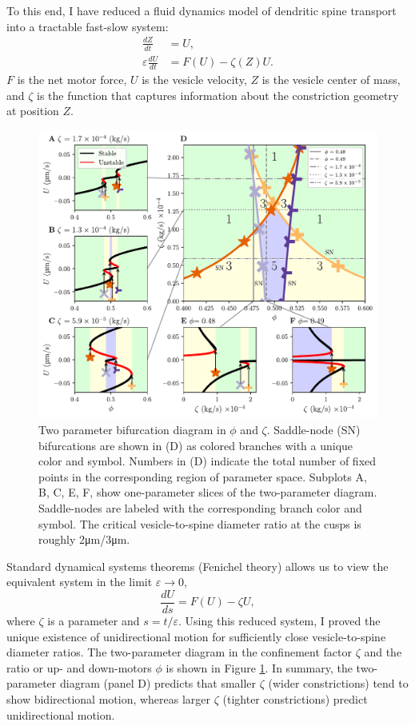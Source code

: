 \documentclass[a4paper,11pt]{article}
\newcommand{\ve}{\varepsilon}
\begin{document}
To this end, I have reduced a fluid dynamics model of dendritic spine transport into a tractable fast-slow system:
\begin{equation}\label{eq:fs1}
	\begin{split}
		\frac{dZ}{dt} &= U,\\
		\ve\frac{dU}{dt} &= F(U) - \zeta(Z) U.
	\end{split}
\end{equation}
$F$ is the net motor force, $U$ is the vesicle velocity, $Z$ is the vesicle center of mass, and $\zeta$ is the function that captures information about the constriction geometry at position $Z$.

\begin{figure}[ht!]
	\centering
	\includegraphics[width=\textwidth]{figures/bifurcations_colored.pdf}
	\caption{Two parameter bifurcation diagram in $\phi$ and $\zeta$. Saddle-node (SN) bifurcations are shown in (D) as colored branches with a unique color and symbol. Numbers in (D) indicate the total number of fixed points in the corresponding region of parameter space. Subplots A, B, C, E, F, show one-parameter slices of the two-parameter diagram. Saddle-nodes are labeled with the corresponding branch color and symbol. The critical vesicle-to-spine diameter ratio at the cusps is roughly 2\si{.\um}/3\si{.\um}.}\label{fig:2par}
\end{figure}

Standard dynamical systems theorems (Fenichel theory) allows us to view the equivalent system in the limit $\ve\rightarrow 0$,
\begin{equation*}
	\frac{dU}{ds} = F(U) - \zeta U,
\end{equation*}
where $\zeta$ is a parameter and  $s=t/\ve$. Using this reduced system, I proved the unique existence of unidirectional motion for sufficiently close vesicle-to-spine diameter ratios. The two-parameter diagram in the confinement factor $\zeta$ and the ratio or up- and down-motors $\phi$ is shown in Figure \ref{fig:2par}. In summary, the two-parameter diagram (panel D) predicts that smaller $\zeta$ (wider constrictions) tend to show bidirectional motion, whereas larger $\zeta$ (tighter constrictions) predict unidirectional motion.
\end{document}
